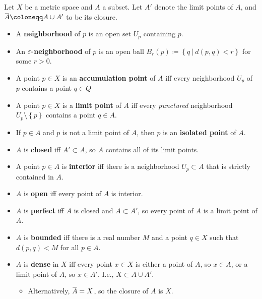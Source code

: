 \begin{definition}

Let \(X\) be a metric space and \(A\) a subset. Let \(A'\) denote the
limit points of \(A\), and
\(\mkern 1.5mu\overline{\mkern-1.5muA\mkern-1.5mu}\mkern 1.5mu \coloneqq A\cup A'\)
to be its closure.

\begin{itemize}
\item
  A \textbf{neighborhood} of \(p\) is an open set \(U_p\) containing
  \(p\).
\item
  An \({\varepsilon}{\hbox{-}}\)\textbf{neighborhood} of \(p\) is an
  open ball
  \(B_r(p) \coloneqq\left\{{q {~\mathrel{\Big|}~}d(p, q) < r}\right\}\)
  for some \(r>0\).
\item
  A point \(p\in X\) is an \textbf{accumulation point} of \(A\) iff
  every neighborhood \(U_p\) of \(p\) contains a point \(q\in Q\)
\item
  A point \(p\in X\) is a \textbf{limit point} of \(A\) iff every
  \emph{punctured} neighborhood \(U_p\setminus\left\{{p}\right\}\)
  contains a point \(q\in A\).
\item
  If \(p\in A\) and \(p\) is not a limit point of \(A\), then \(p\) is
  an \textbf{isolated point} of \(A\).
\item
  \(A\) is \textbf{closed} iff \(A' \subset A\), so \(A\) contains all
  of its limit points.
\item
  A point \(p\in A\) is \textbf{interior} iff there is a neighborhood
  \(U_p \subset A\) that is strictly contained in \(A\).
\item
  \(A\) is \textbf{open} iff every point of \(A\) is interior.
\item
  \(A\) is \textbf{perfect} iff \(A\) is closed and \(A\subset A'\), so
  every point of \(A\) is a limit point of \(A\).
\item
  \(A\) is \textbf{bounded} iff there is a real number \(M\) and a point
  \(q\in X\) such that \(d(p, q) < M\) for all \(p\in A\).
\item
  \(A\) is \textbf{dense} in \(X\) iff every point \(x\in X\) is either
  a point of \(A\), so \(x\in A\), or a limit point of \(A\), so
  \(x\in A'\). I.e., \(X\subset A\cup A'\).

  \begin{itemize}
  \tightlist
  \item
    Alternatively,
    \(\mkern 1.5mu\overline{\mkern-1.5muA\mkern-1.5mu}\mkern 1.5mu = X\),
    so the closure of \(A\) is \(X\).
  \end{itemize}
\end{itemize}

\end{definition}

